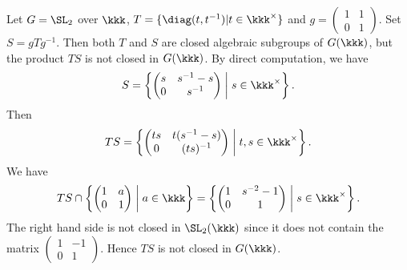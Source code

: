 
    \begin{example}\label{eg:product_of_closed_algebraic_subgroups_which_is_not_closed}
        Let \(G = \SL_2\) over \(\kkk\), \(T = \{\diag(t,t^{-1})|t \in \kkk^\times\}\) and \(g = \begin{pmatrix}
            1 & 1 \\
            0 & 1
        \end{pmatrix}\).
        Set \(S = gTg^{-1}\).
        Then both \(T\) and \(S\) are closed algebraic subgroups of \(G(\kkk)\), but the product \(TS\) is not closed in \(G(\kkk)\).
        By direct computation, we have
        \[ S = \left\{ \begin{pmatrix}
            s & s^{-1}-s \\
            0 & s^{-1}
        \end{pmatrix} \;\middle|\; s \in \kkk^\times \right\}.
        \]
        Then 
        \[ TS = \left\{ \begin{pmatrix}
            ts & t(s^{-1}-s) \\
            0 & (ts)^{-1}
        \end{pmatrix} \;\middle|\; t,s \in \kkk^\times \right\}.
        \]
        We have 
        \[ TS \cap \left\{ \begin{pmatrix}
            1 & a \\
            0 & 1
        \end{pmatrix} \;\middle|\; a \in \kkk \right\} = \left\{ \begin{pmatrix}
            1 & s^{-2}-1 \\
            0 & 1
        \end{pmatrix} \;\middle|\; s \in \kkk^\times \right\}. \]
        The right hand side is not closed in \(\SL_2(\kkk)\) since it does not contain the matrix \(\begin{pmatrix}
            1 & -1 \\
            0 & 1
        \end{pmatrix}\).
        Hence \(TS\) is not closed in \(G(\kkk)\).
    \end{example}

